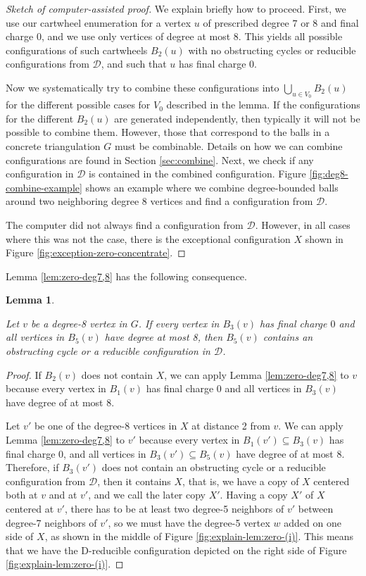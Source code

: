 \documentclass[10pt,a4paper]{article}
\newtheorem{lem}[thm]{Lemma}
\newcommand{\mikkel}[1]{\textbf{\textcolor{red}{{M: } #1}}}
\def\cD{{\mathcal D}}
\def\showlabel#1{}
\begin{document}
\begin{proof}[Sketch of computer-assisted proof] 
We explain briefly how to proceed. 
First, we use our cartwheel enumeration for a vertex $u$ of prescribed degree $7$ or $8$ and final charge 0, and we use only vertices of degree at most 8. This yields all possible configurations of such cartwheels $B_2(u)$ with no obstructing cycles or reducible configurations from $\cD$, and such that $u$ has final charge 0.

Now we systematically try to combine these
configurations into $\bigcup_{u\in V_0}B_2(u)$ for the different possible cases for $V_0$ described in the lemma. If the configurations for the different $B_2(u)$ are generated independently, then typically it will not be possible to combine them. However, 
those that correspond to the balls in a concrete triangulation $G$ must be combinable. Details on how we can combine configurations are found in Section \ref{sec:combine}.
Next, we check if any configuration in $\mathcal{D}$ is contained in the combined configuration.
Figure \ref{fig:deg8-combine-example} shows an example where we combine degree-bounded balls around two neighboring degree 8 vertices
and find a configuration from $\cD$. 

The computer did not always find a configuration from $\cD$. However, in all cases where this was not the case, there is the exceptional configuration $X$ shown in Figure \ref{fig:exception-zero-concentrate}. 
\end{proof}

Lemma \ref{lem:zero-deg7,8} has the following consequence. 
\begin{lem}
\label{lem:zero-8}
\showlabel{lem:zero-8}
    Let $v$ be a degree-8 vertex in $G$.
    If every vertex in $B_3(v)$ has final charge $0$ and all vertices in $B_5(v)$ have degree at most 8, then $B_5(v)$ contains an obstructing cycle or a reducible configuration in $\cD$.
\end{lem}
\begin{proof}
If $B_2(v)$ does not contain $X$, we can apply Lemma \ref{lem:zero-deg7,8} to $v$ because every vertex in $B_1(v)$ has final charge $0$ and all vertices in $B_3(v)$ have degree of at most $8$.

Let $v'$ be one of the degree-$8$ vertices in $X$ at distance 2 from  $v$. We can apply Lemma \ref{lem:zero-deg7,8} to $v'$ because every vertex in $B_1(v') \subseteq B_3(v)$ has final charge 0, and all vertices in $B_3(v') \subseteq B_5(v)$ have degree of at most 8. Therefore, if $B_3(v')$ does not contain an obstructing cycle or a reducible configuration from $\cD$,
then it contains $X$, that is, we have a copy of $X$ centered both at $v$ and at $v'$, and we call the later copy $X'$. Having a copy $X'$ of $X$ centered at $v'$, there has to be at least two degree-5 neighbors of $v'$ between degree-7 neighbors of $v'$, so we must have the degree-5 vertex $w$ added on one side of $X$, as shown in the middle of Figure
\ref{fig:explain-lem:zero-(i)}. This means that we have the D-reducible configuration depicted on the right side of Figure
\ref{fig:explain-lem:zero-(i)}.
\end{proof}
\end{document}
